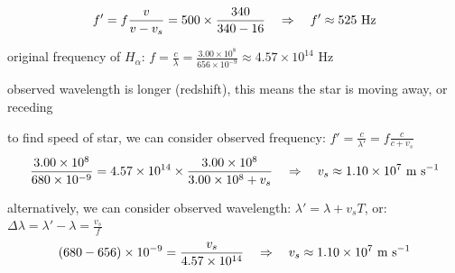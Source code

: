 \solc\begin{equation*}
	f' = f\frac{v}{v - v_s} = 500 \times \frac{340}{340-16} \quad \Rightarrow \quad f' \approx 525 \text{ Hz} 
\end{equation*}


\sol original frequency of $H_\alpha$: $f = \frac{c}{\lambda} = \frac{3.00\times10^8}{656 \times 10^{-9}} \approx 4.57 \times 10^{14} \text{ Hz}$

observed wavelength is longer (redshift), this means the star is moving away, or receding

to find speed of star, we can consider observed frequency: $f' = \frac{c}{\lambda'} = f\frac{c}{c + v_s}$
\begin{equation*}
	\frac{3.00\times10^8}{680\times10^{-9}} = 4.57 \times 10^{14} \times \frac{3.00\times10^8}{3.00\times10^8 + v_s} \quad \Rightarrow \quad v_s \approx 1.10 \times 10^7 \text{ m s$^{-1}$}
\end{equation*}
	
alternatively, we can consider observed wavelength: $\lambda' = \lambda + v_s T$, or: $\Delta \lambda = \lambda' - \lambda = \frac{v_s}{f}$
\begin{equation*}
	(680-656)\times10^{-9} = \frac{v_s}{4.57 \times 10^{14}} \quad \Rightarrow \quad  v_s \approx 1.10 \times 10^7 \text{ m s$^{-1}$} 
\end{equation*}







